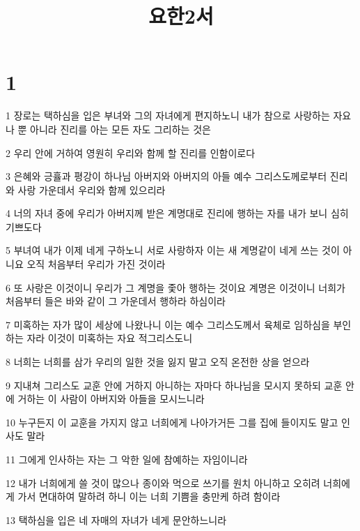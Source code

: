 

\title{요한2서}


\chapter{1}

\par 1 장로는 택하심을 입은 부녀와 그의 자녀에게 편지하노니 내가 참으로 사랑하는 자요 나 뿐 아니라 진리를 아는 모든 자도 그리하는 것은
\par 2 우리 안에 거하여 영원히 우리와 함께 할 진리를 인함이로다
\par 3 은혜와 긍휼과 평강이 하나님 아버지와 아버지의 아들 예수 그리스도께로부터 진리와 사랑 가운데서 우리와 함께 있으리라
\par 4 너의 자녀 중에 우리가 아버지께 받은 계명대로 진리에 행하는 자를 내가 보니 심히 기쁘도다
\par 5 부녀여 내가 이제 네게 구하노니 서로 사랑하자 이는 새 계명같이 네게 쓰는 것이 아니요 오직 처음부터 우리가 가진 것이라
\par 6 또 사랑은 이것이니 우리가 그 계명을 좇아 행하는 것이요 계명은 이것이니 너희가 처음부터 들은 바와 같이 그 가운데서 행하라 하심이라
\par 7 미혹하는 자가 많이 세상에 나왔나니 이는 예수 그리스도께서 육체로 임하심을 부인하는 자라 이것이 미혹하는 자요 적그리스도니
\par 8 너희는 너희를 삼가 우리의 일한 것을 잃지 말고 오직 온전한 상을 얻으라
\par 9 지내쳐 그리스도 교훈 안에 거하지 아니하는 자마다 하나님을 모시지 못하되 교훈 안에 거하는 이 사람이 아버지와 아들을 모시느니라
\par 10 누구든지 이 교훈을 가지지 않고 너희에게 나아가거든 그를 집에 들이지도 말고 인사도 말라
\par 11 그에게 인사하는 자는 그 악한 일에 참예하는 자임이니라
\par 12 내가 너희에게 쓸 것이 많으나 종이와 먹으로 쓰기를 원치 아니하고 오히려 너희에게 가서 면대하여 말하려 하니 이는 너희 기쁨을 충만케 하려 함이라
\par 13 택하심을 입은 네 자매의 자녀가 네게 문안하느니라


